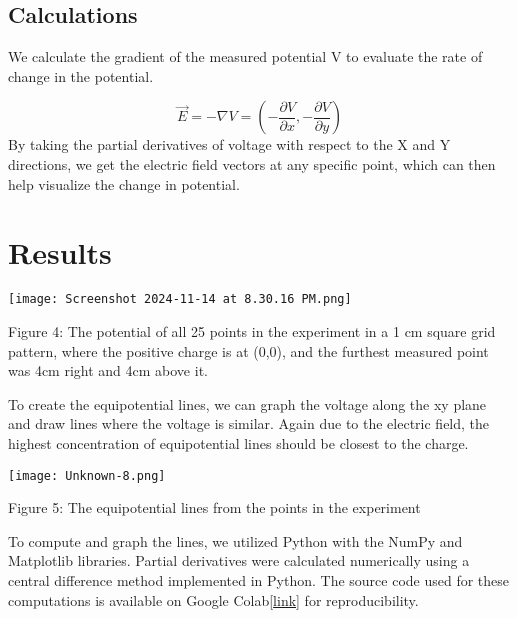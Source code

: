 \documentclass[conference]{IEEEtran}
\begin{document}
\subsection{Calculations}
We calculate the gradient of the measured potential V to evaluate the rate of change in the potential.

\begin{equation}
\vec{E} = -\nabla V = \left( -\frac{\partial V}{\partial x}, -\frac{\partial V}{\partial y} \right)
\end{equation}
By taking the partial derivatives of voltage with respect to the X and Y directions, we get the electric field vectors at any specific point, which can then help visualize the change in potential.


\section{Results}
\begin{center}
    \texttt{[image: Screenshot 2024-11-14 at 8.30.16 PM.png]}
    
    Figure 4: The potential of all 25 points in the experiment in a 1 cm square grid pattern, where the positive charge is at (0,0), and the furthest measured point was 4cm right and 4cm above it.
\end{center}
To create the equipotential lines, we can graph the voltage along the xy plane and draw lines where the voltage is similar. Again due to the electric field, the highest concentration of equipotential lines should be closest to the charge.
\begin{center}
    \texttt{[image: Unknown-8.png]}
    
    Figure 5: The equipotential lines from the points in the experiment
\end{center}
To compute and graph the lines, we utilized Python with the NumPy and Matplotlib libraries. Partial derivatives were calculated numerically using a central difference method implemented in Python. The source code used for these computations is available on Google Colab[\href{https://colab.research.google.com/drive/1tGvBPIV3KCg6DGzSNkJwY9w86lo38hpc?usp=sharing}{link}] for reproducibility.
\end{document}
